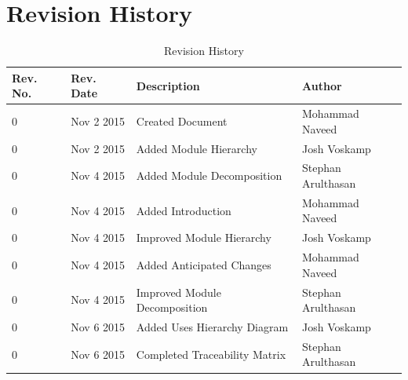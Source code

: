 \documentclass[12pt]{article}
\begin{document}
\newpage
\tableofcontents
\newpage
\listoftables
{}
\newpage
\listoffigures
{}
\newpage

\section*{Revision History}
\begin{table}[!htbp]
	\centering
	\begin{tabular}{ | p{2cm} | p{2cm}| p{6cm} | p{4cm}|}
		\hline
		Rev. No. & Rev. Date & Description & Author \\\hline
		0 & Nov 2 2015 & Created Document & Mohammad Naveed \\\hline
		0 & Nov 2 2015 & Added Module Hierarchy & Josh Voskamp \\\hline
		0 & Nov 4 2015 & Added Module Decomposition & Stephan Arulthasan\\\hline
		0 & Nov 4 2015 & Added Introduction & Mohammad Naveed \\\hline
		0 & Nov 4 2015 & Improved Module Hierarchy & Josh Voskamp \\\hline
		0 & Nov 4 2015 & Added Anticipated Changes & Mohammad Naveed \\\hline
		0 & Nov 4 2015 & Improved Module Decomposition & Stephan Arulthasan \\\hline
		0 & Nov 6 2015 & Added Uses Hierarchy Diagram & Josh Voskamp \\\hline
		0 & Nov 6 2015 & Completed Traceability Matrix & Stephan Arulthasan \\\hline
		
	\end{tabular}
	\caption{Revision History}
\end{table}
\newpage
\end{document}
